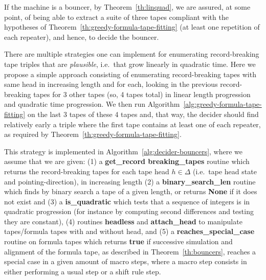 If the machine is a bouncer, by Theorem~\ref{th:linquad}, we are assured, at some point, of being able to extract a suite of three tapes compliant with the hypotheses of Theorem~\ref{th:greedy-formula-tape-fitting} (at least one repetition of each repeater), and hence, to decide the bouncer.

There are multiple strategies one can implement for enumerating record-breaking tape triples that are \textit{plausible}, i.e.\ that grow linearly in quadratic time. Here we propose a simple approach consisting of enumerating record-breaking tapes with same head in increasing length and for each, looking in the previous record-breaking tapes  for 3 other tapes (so, 4 tapes total) in linear length progression and quadratic time progression. We then run Algorithm~\ref{alg:greedy-formula-tape-fitting} on the last 3 tapes of these 4 tapes and, that way, the decider should find relatively early a triple where the first tape contains at least one of each repeater, as required by Theorem~\ref{th:greedy-formula-tape-fitting}.

This strategy is implemented in Algorithm~\ref{alg:decider-bouncers}, where we assume that we are given: (1) a \textbf{get\_record breaking\_tapes} routine which returns the record-breaking tapes for each tape head $h\in\Delta$ (i.e.\ tape head state and pointing-direction), in increasing length (2) a \textbf{binary\_search\_len} routine which finds by binary search a tape of a given length, or returns \textbf{None} if it does not exist and (3) a \textbf{is\_quadratic} which tests that a sequence of integers is in quadratic progression (for instance by computing second differences and testing they are constant), (4) routines \textbf{headless} and \textbf{attach\_head} to manipulate tapes/formula tapes with and without head, and (5) a \textbf{reaches\_special\_case} routine on formula tapes which returns \textbf{true} if successive simulation and alignment of the formula tape, as described in Theorem~\ref{th:bouncers}, reaches a special case in a given amount of macro steps, where a macro step consists in either performing a usual step or a shift rule step.

